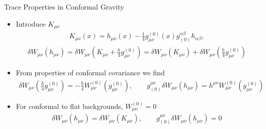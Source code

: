 \documentclass[8pt,aspectratio=1610]{beamer}
\begin{document}
\begin{frame}{Trace Properties in Conformal Gravity}
	\begin{itemize}
		\item Introduce $K_{\mu\nu}$
		\begin{eqnarray}
		K_{\mu\nu}(x)=h_{\mu\nu}(x)-\frac{1}{4}g^{(0)}_{\mu\nu}(x)g_{(0)}^{\alpha\beta}h_{\alpha\beta},
		\end{eqnarray}
		\begin{eqnarray}
		\delta W_{\mu\nu}(h_{\mu\nu}) = \delta W_{\mu\nu}\left(K_{\mu\nu}+\frac h4g^{(0)}_{\mu\nu}\right)= \delta W_{\mu\nu}(K_{\mu\nu}) +\delta W_{\mu\nu}\left(\frac h4g^{(0)}_{\mu\nu}\right)
		\end{eqnarray}
		\item From properties of conformal covariance we find
		\begin{eqnarray}
		 \delta W_{\mu\nu}\left(\frac h4 g^{(0)}_{\mu\nu} \right)=-\frac{h}{4} W^{(0)}_{\mu\nu}(g_{\mu\nu}^{(0)}),
		 \qquad 
		 g_{(0)}^{\mu\nu}\delta W_{\mu\nu}(h_{\mu\nu}) = h^{\mu\nu}W^{(0)}_{\mu\nu}(g^{(0)}_{\mu\nu})
		\end{eqnarray}
		\item For conformal to flat backgrounds, $W_{\mu\nu}^{(0)} = 0$
		\begin{eqnarray}
		\delta W_{\mu\nu}(h_{\mu\nu}) = \delta W_{\mu\nu}(K_{\mu\nu}),\qquad g_{(0)}^{\mu\nu}\delta W_{\mu\nu}(h_{\mu\nu})=0
		\end{eqnarray}
	\end{itemize}
\end{frame}

\end{document}
